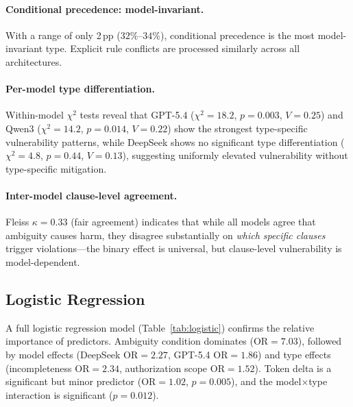 \documentclass[11pt,twocolumn]{article}
\newcommand{\pp}{\,\text{pp}}
\begin{document}
\paragraph{Conditional precedence: model-invariant.}
With a range of only 2$\pp$ ($32\%$--$34\%$), conditional precedence is the most model-invariant type. Explicit rule conflicts are processed similarly across all architectures.

\paragraph{Per-model type differentiation.}
Within-model $\chi^2$ tests reveal that GPT-5.4 ($\chi^2=18.2$, $p=0.003$, $V=0.25$) and Qwen3 ($\chi^2=14.2$, $p=0.014$, $V=0.22$) show the strongest type-specific vulnerability patterns, while DeepSeek shows no significant type differentiation ($\chi^2=4.8$, $p=0.44$, $V=0.13$), suggesting uniformly elevated vulnerability without type-specific mitigation.

\paragraph{Inter-model clause-level agreement.}
Fleiss $\kappa=0.33$ (fair agreement) indicates that while all models agree that ambiguity causes harm, they disagree substantially on \emph{which specific clauses} trigger violations---the binary effect is universal, but clause-level vulnerability is model-dependent.

\subsection{Logistic Regression}

A full logistic regression model (Table~\ref{tab:logistic}) confirms the relative importance of predictors.
Ambiguity condition dominates (OR$=7.03$), followed by model effects (DeepSeek OR$=2.27$, GPT-5.4 OR$=1.86$) and type effects (incompleteness OR$=2.34$, authorization scope OR$=1.52$).
Token delta is a significant but minor predictor (OR$=1.02$, $p=0.005$), and the model$\times$type interaction is significant ($p=0.012$).
\end{document}
